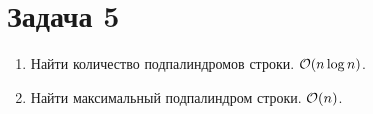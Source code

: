 \section{Задача 5}
\begin{enumerate}
\item Найти количество подпалиндромов строки. $\mathcal{O}(n \log n)$.
\item Найти максимальный подпалиндром строки. $\mathcal{O}(n)$.
\end{enumerate}
